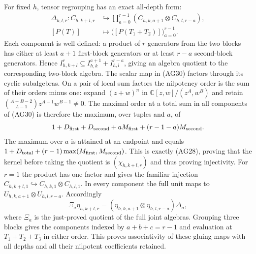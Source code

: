 For fixed $h$, tensor regrouping has an exact all-depth form:
\[
 \begin{split}
 \Delta_{k,l,r}:C_{h,k+l,r}&\hookrightarrow
   \prod_{a=0}^{r-1}(C_{h,k,a+1}\otimes C_{h,l,r-a}),\\
 [P(T)]&\longmapsto\bigl([P(T_1+T_2)]\bigr)_{a=0}^{r-1}.
 \end{split}\tag{AG30}
\]
Each component is well defined: a product of $r$ generators from
the two blocks has either at least $a+1$ first-block generators
or at least $r-a$ second-block generators.  Hence
$I_{h,k+l}^r\subseteq I_{h,k}^{a+1}+I_{h,l}^{r-a}$,
giving an algebra quotient to the corresponding two-block algebra.
The scalar map in (AG30) factors through its cyclic subalgebras.
On a pair of local sum factors the nilpotency order is the sum
of their orders minus one: expand $(z+w)^n$ in
$\mathbb C[z,w]/(z^A,w^B)$ and retain
$\binom{A+B-2}{A-1}z^{A-1}w^{B-1}\ne0$.
The maximal order at a total sum in all components of (AG30) is
therefore the maximum, over tuples and $a$, of
\[
 1+D_{\rm first}+D_{\rm second}
             +aM_{\rm first}+(r-1-a)M_{\rm second}.
\]
The maximum over $a$ is attained at an endpoint and equals
$1+D_{\rm total}+(r-1)\max(M_{\rm first},M_{\rm second})$.
This is exactly (AG28), proving that the kernel before taking
the quotient is $(\chi_{h,k+l,r})$ and thus proving injectivity.
For $r=1$ the product has one factor and gives the familiar
injection $C_{h,k+l,1}\hookrightarrow C_{h,k,1}\otimes C_{h,l,1}$.
In every component the full unit maps to
$U_{h,k,a+1}\otimes U_{h,l,r-a}$.  Accordingly
\[
 \Xi_a\eta_{h,k+l,r}
       =(\eta_{h,k,a+1}\otimes\eta_{h,l,r-a})\Delta_a,
 \tag{AG31}
\]
where $\Xi_a$ is the just-proved quotient of the full joint
algebras.  Grouping three blocks gives the components indexed by
$a+b+c=r-1$ and evaluation at $T_1+T_2+T_3$ in either order.
This proves associativity of these gluing maps with all depths
and all their nilpotent coefficients retained.

